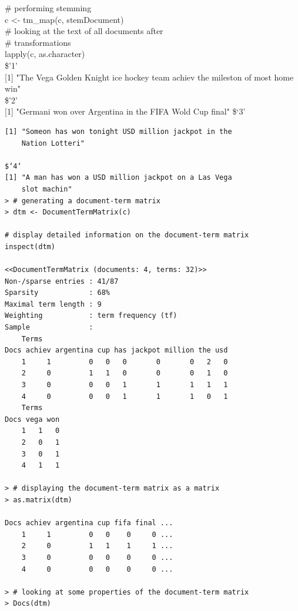\documentclass[11pt,openany,executivepaper]{book}
\begin{document}
\begin{displayquote}
\# performing stemming\\
c <- tm\_map(c, stemDocument)\\
\# looking at the text of all documents after\\
\# transformations\\
lapply(c, as.character)\\
\$'1'\\[0pt]
[1] "The Vega Golden Knight ice hockey team achiev the mileston of most home win"\\
\$'2'\\[0pt]
[1] "Germani won over Argentina in the FIFA Wold Cup final" \$‘3’
\end{displayquote}


\begin{verbatim}
[1] "Someon has won tonight USD million jackpot in the
    Nation Lotteri"
    
$‘4‘
[1] "A man has won a USD million jackpot on a Las Vega
    slot machin"
> # generating a document-term matrix
> dtm <- DocumentTermMatrix(c)

# display detailed information on the document-term matrix
inspect(dtm)

<<DocumentTermMatrix (documents: 4, terms: 32)>>
Non-/sparse entries : 41/87
Sparsity            : 68%
Maximal term length : 9
Weighting           : term frequency (tf)
Sample              :
    Terms
Docs achiev argentina cup has jackpot million the usd
    1     1         0   0   0       0       0   2   0
    2     0         1   1   0       0       0   1   0
    3     0         0   0   1       1       1   1   1
    4     0         0   0   1       1       1   0   1
    Terms
Docs vega won
    1   1   0
    2   0   1
    3   0   1
    4   1   1

> # displaying the document-term matrix as a matrix
> as.matrix(dtm)

Docs achiev argentina cup fifa final ...
    1     1         0   0    0     0 ...
    2     0         1   1    1     1 ...
    3     0         0   0    0     0 ...
    4     0         0   0    0     0 ...

> # looking at some properties of the document-term matrix
> Docs(dtm)
\end{verbatim}
\end{document}
